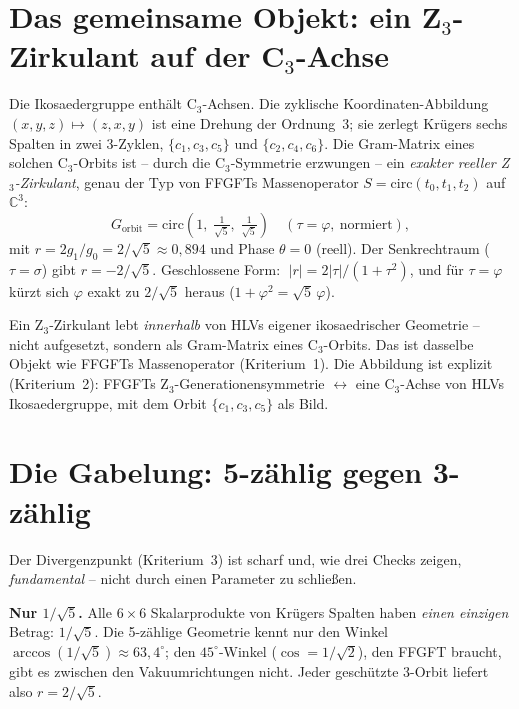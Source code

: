\section{Das gemeinsame Objekt: ein Z$_3$-Zirkulant auf der C$_3$-Achse}

Die Ikosaedergruppe enthält C$_3$-Achsen. Die zyklische Koordinaten-Abbildung
$(x,y,z)\mapsto(z,x,y)$ ist eine Drehung der Ordnung~3; sie zerlegt Krügers sechs
Spalten in zwei 3-Zyklen, $\{c_1,c_3,c_5\}$ und $\{c_2,c_4,c_6\}$. Die Gram-Matrix
eines solchen C$_3$-Orbits ist -- durch die C$_3$-Symmetrie erzwungen -- ein
\emph{exakter reeller Z$_3$-Zirkulant}, genau der Typ von FFGFTs Massenoperator
$S=\mathrm{circ}(t_0,t_1,t_2)$ auf $\mathbb{C}^3$:
\[
G_{\text{orbit}}=\mathrm{circ}\!\left(1,\;\tfrac{1}{\sqrt5},\;\tfrac{1}{\sqrt5}\right)
\quad(\tau=\varphi,\ \text{normiert}),
\]
mit $r=2g_1/g_0=2/\sqrt5\approx0{,}894$ und Phase $\theta=0$ (reell). Der
Senkrechtraum ($\tau=\sigma$) gibt $r=-2/\sqrt5$. Geschlossene Form:
$\;|r|=2|\tau|/(1+\tau^2)$, und für $\tau=\varphi$ kürzt sich $\varphi$ exakt zu
$2/\sqrt5$ heraus ($1+\varphi^2=\sqrt5\,\varphi$).

\begin{keyresult}
Ein Z$_3$-Zirkulant lebt \emph{innerhalb} von HLVs eigener ikosaedrischer Geometrie
-- nicht aufgesetzt, sondern als Gram-Matrix eines C$_3$-Orbits. Das ist dasselbe
Objekt wie FFGFTs Massenoperator (Kriterium~1). Die Abbildung ist explizit
(Kriterium~2): FFGFTs Z$_3$-Generationensymmetrie $\leftrightarrow$ eine C$_3$-Achse
von HLVs Ikosaedergruppe, mit dem Orbit $\{c_1,c_3,c_5\}$ als Bild.
\end{keyresult}

\section{Die Gabelung: 5-zählig gegen 3-zählig}

Der Divergenzpunkt (Kriterium~3) ist scharf und, wie drei Checks zeigen,
\emph{fundamental} -- nicht durch einen Parameter zu schließen.

\textbf{Nur $1/\sqrt5$.} Alle $6\times6$ Skalarprodukte von Krügers Spalten haben
\emph{einen einzigen} Betrag: $1/\sqrt5$. Die 5-zählige Geometrie kennt nur den
Winkel $\arccos(1/\sqrt5)\approx63{,}4^\circ$; den $45^\circ$-Winkel
($\cos=1/\sqrt2$), den FFGFT braucht, gibt es zwischen den Vakuumrichtungen nicht.
Jeder geschützte 3-Orbit liefert also $r=2/\sqrt5$.

